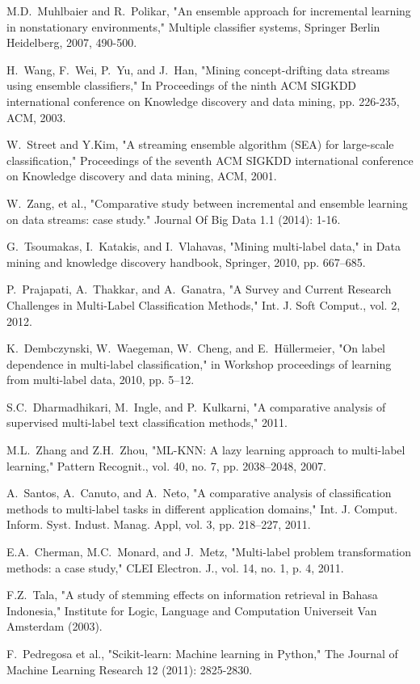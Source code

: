 \documentclass[conference]{IEEEtran}
\begin{document}
\begin{thebibliography}{1}
M.D.~Muhlbaier and R.~Polikar,
    "An ensemble approach for incremental learning in nonstationary environments,"
    Multiple classifier systems, Springer Berlin Heidelberg, 2007, 490-500.

H.~Wang, F.~Wei, P.~Yu, and J.~Han,
    "Mining concept-drifting data streams using ensemble classifiers,"
    In Proceedings of the ninth ACM SIGKDD international conference on Knowledge discovery and data mining,
    pp. 226-235, ACM, 2003.
    
W.~Street and Y.Kim,
    "A streaming ensemble algorithm (SEA) for large-scale classification," 
    Proceedings of the seventh ACM SIGKDD international conference on Knowledge discovery and data mining,
    ACM, 2001.

W.~Zang, et al.,
    "Comparative study between incremental and ensemble learning on data streams: case study."
    Journal Of Big Data 1.1 (2014): 1-16.

G.~Tsoumakas, I.~Katakis, and I.~Vlahavas,
    "Mining multi-label data,"
    in Data mining and knowledge discovery handbook,
    Springer, 2010, pp. 667–685.

P.~Prajapati, A.~Thakkar, and A.~Ganatra,
    "A Survey and Current Research Challenges in Multi-Label Classification Methods,"
    Int. J. Soft Comput., vol. 2, 2012.

K.~Dembczynski, W.~Waegeman, W.~Cheng, and E.~Hüllermeier,
    "On label dependence in multi-label classification,"
    in Workshop proceedings of learning from multi-label data,
    2010, pp. 5–12.

S.C.~Dharmadhikari, M.~Ingle, and P.~Kulkarni,
    "A comparative analysis of supervised multi-label text classification methods,"
    2011.

M.L.~Zhang and Z.H.~Zhou,
    "ML-KNN: A lazy learning approach to multi-label learning,"
    Pattern Recognit., vol. 40, no. 7, pp. 2038–2048, 2007.

A.~Santos, A.~Canuto, and A.~Neto,
    "A comparative analysis of classification methods to multi-label tasks in different application domains,"
    Int. J. Comput. Inform. Syst. Indust. Manag. Appl, vol. 3,
    pp. 218–227, 2011.

E.A.~Cherman, M.C.~Monard, and J.~Metz,
    "Multi-label problem transformation methods: a case study,"
    CLEI Electron. J., vol. 14, no. 1, p. 4, 2011.
    
F.Z.~Tala,
    "A study of stemming effects on information retrieval in Bahasa Indonesia,"
    Institute for Logic, Language and Computation Universeit Van Amsterdam (2003).
    
F.~Pedregosa et al.,
    "Scikit-learn: Machine learning in Python,"
    The Journal of Machine Learning Research 12 (2011): 2825-2830.

\end{thebibliography}
\end{document}
